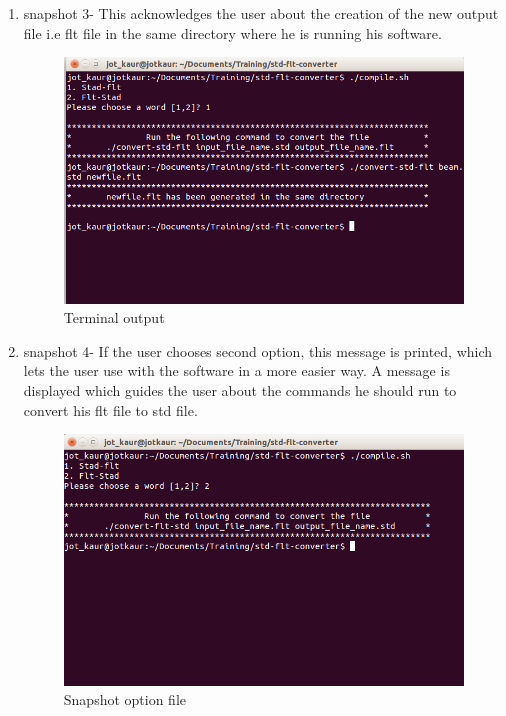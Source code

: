 \begin{enumerate}
\item snapshot 3- This acknowledges the user about the creation of the new output file i.e flt file in the same directory where he is running his software.\\
\begin{figure} [h!]
\centering
\includegraphics[scale=0.3]{images/3.png}
\caption{Terminal output}
\end{figure}

\item snapshot 4- If the user chooses second option, this message is printed, which lets the user use with the software in a more easier way. A message is displayed which guides the user about the commands he should run to convert his flt file to std file.\\
\begin{figure} [h!]
\centering
\includegraphics[scale=0.3]{images/5.png}
\caption{Snapshot option file}
\end{figure}


\end{enumerate}
